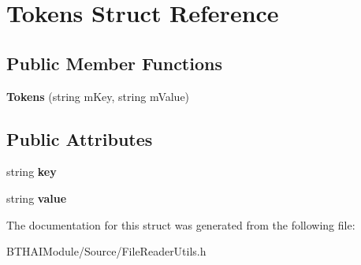 \hypertarget{struct_tokens}{\section{Tokens Struct Reference}
\label{struct_tokens}
}
\subsection*{Public Member Functions}
\begin{DoxyCompactItemize}
\item 
\hypertarget{struct_tokens_ace68f89fe4f05ffabada2ff70dba7053}{{\bfseries Tokens} (string m\-Key, string m\-Value)}\label{struct_tokens_ace68f89fe4f05ffabada2ff70dba7053}

\end{DoxyCompactItemize}
\subsection*{Public Attributes}
\begin{DoxyCompactItemize}
\item 
\hypertarget{struct_tokens_a145b81ff4430ad25ec52686d03d53b5b}{string {\bfseries key}}\label{struct_tokens_a145b81ff4430ad25ec52686d03d53b5b}

\item 
\hypertarget{struct_tokens_a318c90e49e10e52ac2563e15ced25d60}{string {\bfseries value}}\label{struct_tokens_a318c90e49e10e52ac2563e15ced25d60}

\end{DoxyCompactItemize}


The documentation for this struct was generated from the following file\-:\begin{DoxyCompactItemize}
\item 
B\-T\-H\-A\-I\-Module/\-Source/File\-Reader\-Utils.\-h\end{DoxyCompactItemize}
